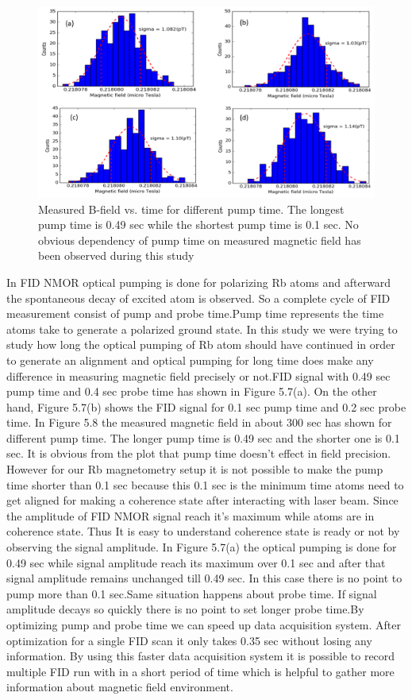 \documentclass[12pt]{report}
\begin{document}
   \begin{figure}[h]
\centering\includegraphics[width=0.75\linewidth]{figures/pump_time}
\caption{Measured B-field vs. time   for different pump time. The longest pump time is 0.49 sec while the shortest pump time is 0.1 sec. No obvious dependency of pump time on  measured magnetic field has been observed during this study}
\end{figure}
In FID NMOR optical pumping is done for polarizing Rb atoms and afterward the spontaneous decay of excited atom is observed. So a complete cycle of FID measurement consist of pump and probe time.Pump time represents the time atoms take to generate a polarized ground state. In this study we were trying to study how long the optical pumping of Rb atom should have continued in order to generate an alignment and optical pumping for long time does make any difference in measuring magnetic field precisely or not.FID signal with 0.49 sec pump time and 0.4 sec probe time has shown in Figure 5.7(a). On the other hand, Figure 5.7(b) shows  the FID signal for 0.1 sec pump time and 0.2 sec probe time. In Figure 5.8 the measured magnetic field in about 300 sec has shown for different pump time. The longer pump time is 0.49 sec and the shorter one is 0.1 sec. It is obvious from the plot that pump time doesn't effect in field precision. However for our Rb magnetometry setup it is not possible to make the pump time shorter than 0.1 sec because this 0.1 sec is the minimum time atoms need to get aligned for making a coherence state after interacting with laser beam. Since the amplitude of FID NMOR signal reach it's maximum while atoms are in coherence state. Thus It is easy to understand coherence state is ready or not by observing the signal amplitude. In Figure 5.7(a) the optical pumping is done for 0.49 sec while signal amplitude reach its maximum over 0.1 sec and after that signal amplitude remains unchanged till 0.49 sec. In this case there is no point to pump more than 0.1 sec.Same situation happens about probe time. If signal amplitude decays so quickly there is no point to set longer probe time.By optimizing pump and probe time we can speed up data acquisition system. After optimization for a single FID scan it only takes 0.35 sec without losing any information. By using this faster data acquisition system it is possible to record multiple FID run with in a short period of time which is helpful to gather more information about magnetic field environment.
\newpage
\end{document}
